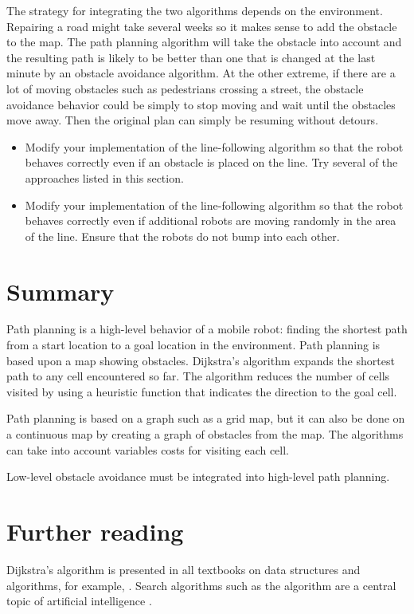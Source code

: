 The strategy for integrating the two algorithms depends on the environment. Repairing a road might take several weeks so it makes sense to add the obstacle to the map. The path planning algorithm will take the obstacle into account and the resulting path is likely to be better than one that is changed at the last minute by an obstacle avoidance algorithm. At the other extreme, if there are a lot of moving obstacles such as pedestrians crossing a street, the obstacle avoidance behavior could be simply to stop moving and wait until the obstacles move away. Then the original plan can simply be resuming without detours.

\begin{framed}
\begin{itemize}
\item Modify your implementation of the line-following algorithm so that the robot behaves correctly even if an obstacle is placed on the line. Try several of the approaches listed in this section.
\item Modify your implementation of the line-following algorithm so that the robot behaves correctly even if additional robots are moving randomly in the area of the line. Ensure that the robots do not bump into each other.
\end{itemize}
\end{framed}

\section{Summary}

Path planning is a high-level behavior of a mobile robot: finding the shortest path from a start location to a goal location in the environment. Path planning is based upon a map showing obstacles. Dijkstra's algorithm expands the shortest path to any cell encountered so far. The \astar{} algorithm reduces the number of cells visited by using a heuristic function that indicates the direction to the goal cell.

Path planning is based on a graph such as a grid map, but it can also be done on a continuous map by creating a graph of obstacles from the map. The algorithms can take into account variables costs for visiting each cell.

Low-level obstacle avoidance must be integrated into high-level path planning.

\section{Further reading}

Dijkstra's algorithm is presented in all textbooks on data structures and algorithms, for example, \cite[Sect.~24.3]{crls3}. Search algorithms such as the \astar{} algorithm are a central topic of artificial intelligence \cite[Sect.~3.5]{ai}.



